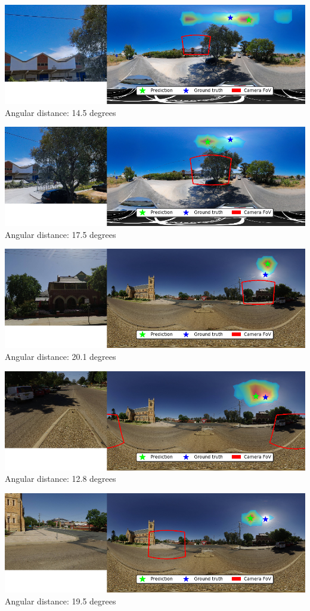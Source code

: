 \begin{multicols}{2}
\includegraphics[width=\mywidth]{pano_aaezuadrpeomdf_002.jpg}\\
Angular distance: 14.5 degrees

\includegraphics[width=\mywidth]{pano_aaezuadrpeomdf_004.jpg}\\
Angular distance: 17.5 degrees

\includegraphics[width=\mywidth]{pano_aagpbpdmorbfwq_005.jpg}\\
Angular distance: 20.1 degrees

\includegraphics[width=\mywidth]{pano_aagpbpdmorbfwq_006.jpg}\\
Angular distance: 12.8 degrees

\includegraphics[width=\mywidth]{pano_aagpbpdmorbfwq_002.jpg}\\
Angular distance: 19.5 degrees


\end{multicols}
